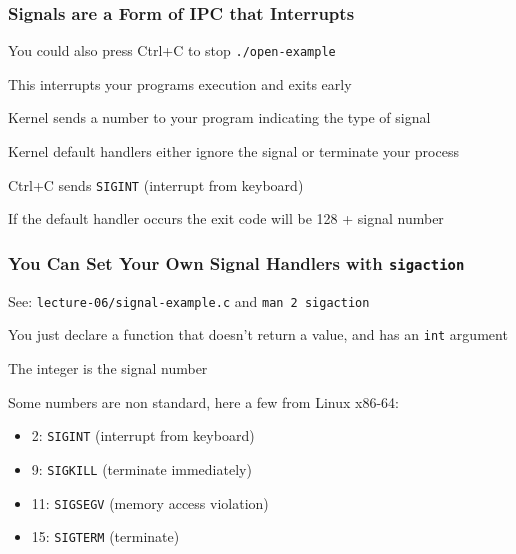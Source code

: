   \begin{frame}
    \frametitle{Signals are a Form of IPC that Interrupts}

    You could also press Ctrl+C to stop \texttt{./open-example}

    \hspace{2em} This interrupts your programs execution and exits early

    \vspace{2em}

    Kernel sends a number to your program indicating the type of signal
    
    \hspace{2em} Kernel default handlers either ignore the signal or terminate
    your process

    \vspace{2em}

    Ctrl+C sends \texttt{SIGINT} (interrupt from keyboard)

    \vspace{2em}

    If the default handler occurs the exit code will be 128 + signal number
  \end{frame}

  \begin{frame}
    \frametitle{You Can Set Your Own Signal Handlers with \texttt{sigaction}}

    See: \texttt{lecture-06/signal-example.c} and \texttt{man 2 sigaction}

    \vspace{2em}

    You just declare a function that doesn't return a value, and has an \texttt{int} argument

    \hspace{2em} The integer is the signal number

    \vspace{2em}

    Some numbers are non standard, here a few from Linux x86-64:
    \begin{itemize}
      \item 2: \texttt{SIGINT} (interrupt from keyboard)
      \item 9: \texttt{SIGKILL} (terminate immediately)
      \item 11: \texttt{SIGSEGV} (memory access violation)
      \item 15: \texttt{SIGTERM} (terminate)
    \end{itemize}
  \end{frame}

